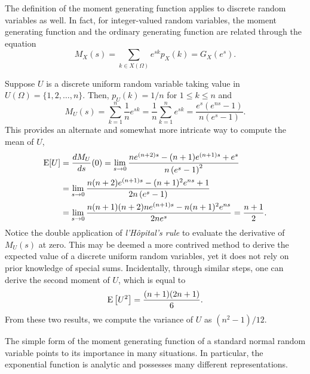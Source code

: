 The definition of the moment generating function applies to discrete random variables as well.
In fact, for integer-valued random variables, the moment generating function and the ordinary generating function are related through the equation  
\begin{equation*}
M_X (s) = \sum_{k \in X(\Omega)} e^{sk} p_X(k) = G_X (e^s) .
\end{equation*}

\begin{example}
Suppose $U$ is a discrete uniform random variable taking value in $U(\Omega) = \{ 1, 2, \ldots, n \}$.
Then, $p_U(k) = 1/n$ for $1 \leq k \leq n$ and
\begin{equation*}
M_U(s) = \sum_{k = 1}^n \frac{1}{n} e^{sk}
= \frac{1}{n} \sum_{k = 1}^n e^{sk}
= \frac {e^s (e^{ns} - 1)} {n (e^s - 1)} .
\end{equation*}
This provides an alternate and somewhat more intricate way to compute the mean of $U$,
\begin{equation*}
\begin{split}
\mathrm{E} [U] &= \frac{d M_U}{ds} (0)
= \lim_{s \rightarrow 0}
\frac{n e^{(n+2)s} - (n+1) e^{(n+1)s} + e^s}{n \left( e^s - 1 \right)^2} \\
&= \lim_{s \rightarrow 0}
\frac{n(n+2) e^{(n+1)s} - (n+1)^2 e^{ns} + 1}{2n \left( e^s - 1 \right)} \\
&= \lim_{s \rightarrow 0}
\frac{n(n+1)(n+2)n e^{(n+1)s} - n (n+1)^2 e^{ns}}{2n e^s}
= \frac {n + 1}{2} .
\end{split}
\end{equation*}
Notice the double application of \emph{l'H\^{o}pital's rule} to evaluate the derivative of $M_U(s)$ at zero.
This may be deemed a more contrived method to derive the expected value of a discrete uniform random variables, yet it does not rely on prior knowledge of special sums.
Incidentally, through similar steps, one can derive the second moment of $U$, which is equal to
\begin{equation*}
\mathrm{E} \left[ U^2 \right] = \frac{(n+1)(2n+1)}{6} .
\end{equation*}
From these two results, we compute the variance of $U$ as $(n^2 - 1)/12$.
\end{example}

The simple form of the moment generating function of a standard normal random variable points to its importance in many situations.
In particular, the exponential function is analytic and possesses many different representations.

